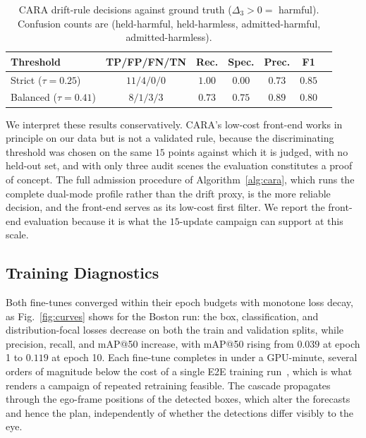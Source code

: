 \documentclass[conference]{IEEEtran}
\begin{document}
\begin{table}[htbp]
\caption{CARA drift-rule decisions against ground truth ($\Delta_3 > 0 =$
harmful). Confusion counts are (held-harmful, held-harmless, admitted-harmful,
admitted-harmless).}
\label{tab:admission}
\centering
\renewcommand{\arraystretch}{1.2}
\setlength{\tabcolsep}{5pt}
\begin{tabular}{@{}lcccccc@{}}
\toprule
\textbf{Threshold} & \textbf{TP/FP/FN/TN} & \textbf{Rec.} & \textbf{Spec.} & \textbf{Prec.} & \textbf{F1} \\
\midrule
Strict ($\tau{=}0.25$)   & $11/4/0/0$ & $1.00$ & $0.00$ & $0.73$ & $0.85$ \\
Balanced ($\tau{=}0.41$) & $8/1/3/3$  & $0.73$ & $0.75$ & $0.89$ & $0.80$ \\
\bottomrule
\end{tabular}
\end{table}

We interpret these results conservatively. CARA's low-cost front-end works in
principle on our data but is not a validated rule, because the discriminating
threshold was chosen on the same $15$ points against which it is judged, with no
held-out set, and with only three audit scenes the evaluation constitutes a proof
of concept. The full admission procedure of Algorithm~\ref{alg:cara}, which runs
the complete dual-mode profile rather than the drift proxy, is the more reliable
decision, and the front-end serves as its low-cost first filter. We report the
front-end evaluation because it is what the $15$-update campaign can support at
this scale.

\subsection{Training Diagnostics}
Both fine-tunes converged within their epoch budgets with monotone loss
decay, as Fig.~\ref{fig:curves} shows for the Boston run: the box,
classification, and distribution-focal losses decrease on both the train and
validation splits, while precision, recall, and mAP@50 increase, with mAP@50
rising from $0.039$ at epoch 1 to $0.119$ at epoch 10. Each fine-tune completes
in under a GPU-minute, several orders of magnitude below the cost of a single
E2E training run~\cite{sun2024sparsedrive}, which is what renders a campaign of
repeated retraining feasible. The cascade propagates through the ego-frame
positions of the detected boxes, which alter the forecasts and hence the plan,
independently of whether the detections differ visibly to the eye.
\end{document}
